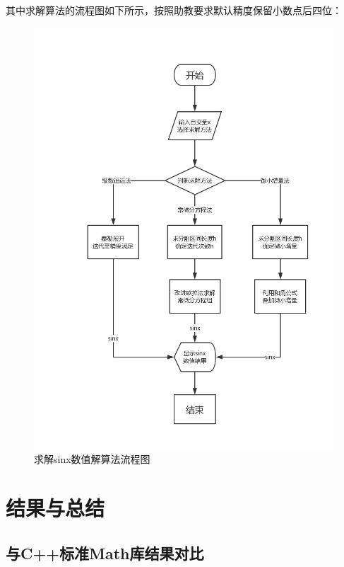 \documentclass[UTF8]{ctexart}
\begin{document}
其中求解算法的流程图如下所示，按照助教要求默认精度保留小数点后四位：
\begin{figure}[H]
    \centering
    \includegraphics[scale=0.4]{images/procedure.png}
    \caption{求解sinx数值解算法流程图}
\end{figure}

\section{结果与总结}

\subsection{与C++标准Math库结果对比}
\end{document}
